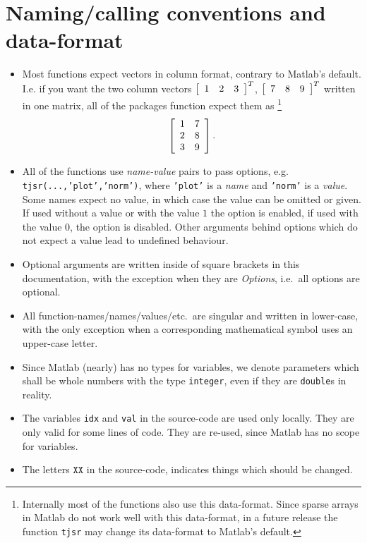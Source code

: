 \section{Naming/calling conventions and data-format}
\begin{itemize}
\item Most functions expect vectors in column format, contrary to Matlab's default. I.e. if you want the two column vectors 
$\left[\begin{array}{c c c}1&2&3\end{array}\right]^T$,
$\left[\begin{array}{c c c}7&8&9\end{array}\right]^T$
written in one matrix, all of the packages function expect them as%
\footnote{Internally most of the functions also use this data-format. 
Since sparse arrays in Matlab do not work well with this data-format, 
in a future release the function \texttt{tjsr} may change its data-format 
to Matlab's default.}
\begin{equation*}
\left[\begin{array}{c c c}1&7\\2&8\\3&9\end{array}\right].
\end{equation*}


\item All of the functions use \emph{name-value} pairs to pass options, e.g. \texttt{tjsr(...,'plot','norm')}, where \texttt{'plot'} is a \emph{name} and \texttt{'norm'} is a \emph{value}.
Some names expect no value, in which case the value can be omitted or given. 
If used without a value or with the value $1$ the option is enabled, if used with the value $0$, the option is disabled. 
Other arguments behind options which do not expect a value lead to undefined behaviour.

\item Optional arguments are written inside of square brackets in this documentation, with the exception when they are \emph{Options}, i.e.\ all options are optional.

\item All function-names/names/values/etc.\ are singular and written in lower-case, with the only exception when a corresponding mathematical symbol uses an upper-case letter.

\item Since Matlab (nearly) has no types for variables, we denote parameters which shall be whole numbers with the type \texttt{integer}, even if they are \texttt{double}s in reality.

\item The variables \texttt{idx} and \texttt{val} in the source-code are used only locally. They are only valid for some lines of code. They are re-used, since Matlab has no scope for variables.

\item The letters $\texttt{XX}$ in the source-code, indicates things which should be changed.
\end{itemize}

